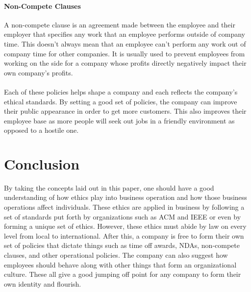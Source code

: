 \documentclass[notitlepage,a4paper,12pt]{article}
\begin{document}
\paragraph{Non-Compete Clauses}A non-compete clause is an agreement made between the employee and their employer that specifies any work that an employee performs outside of company time. This doesn't always mean that an employee can't perform any work out of company time for other companies. It is usually used to prevent employees from working on the side for a company whose profits directly negatively impact their own company's profits.
\paragraph{}Each of these policies helps shape a company and each reflects the company's ethical standards. By setting a good set of policies, the company can improve their public appearance in order to get more customers. This also improves their employee base as more people will seek out jobs in a friendly environment as opposed to a hostile one.

\section*{Conclusion}
\paragraph{}By taking the concepts laid out in this paper, one should have a good understanding of how ethics play into business operation and how those business operations affect individuals. These ethics are applied in business by following a set of standards put forth by organizations such as ACM and IEEE or even by forming a unique set of ethics. However, these ethics must abide by law on every level from local to international. After this, a company is free to form their own set of policies that dictate things such as time off awards, NDAs, non-compete clauses, and other operational policies. The company can also suggest how employees should behave along with other things that form an organizational culture. These all give a good jumping off point for any company to form their own identity and flourish.
\end{document}
